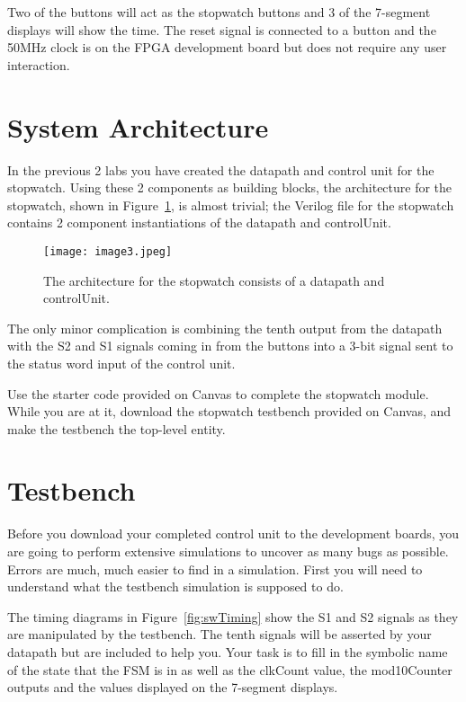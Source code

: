 Two of the buttons will act as the stopwatch buttons
and 3 of the 7-segment displays will show the time. The reset signal is
connected to a button and the 50MHz clock is on the FPGA
development board but does not require any user
interaction.

\section{System Architecture}

In the previous 2 labs you have created the datapath and control unit
for the stopwatch. Using these 2 components as building blocks, the
architecture for the stopwatch, shown in Figure~\ref{fig:swArch}, is almost trivial;
the Verilog file for the stopwatch contains 2 component instantiations
of the datapath and controlUnit.

\begin{figure}
\texttt{[image: image3.jpeg]}
\caption{The architecture for the stopwatch consists of a datapath and
controlUnit.}
\label{fig:swArch}
\end{figure}

The only minor complication is combining the tenth output from the
datapath with the S2 and S1 signals coming in from the
buttons into a 3-bit signal sent to the status word input of the control
unit.

Use the starter code provided on Canvas to complete the stopwatch
module. While you are at it, download the stopwatch testbench provided
on Canvas, and make the testbench the top-level entity.

\section{Testbench}

Before you download your completed control unit to the development boards,
you are going to perform extensive simulations to uncover as many bugs
as possible. Errors are much, much easier to find in a simulation. First
you will need to understand what the testbench simulation is supposed to
do.

The timing diagrams in Figure~\ref{fig:swTiming} show the S1 and S2 signals
as they are manipulated by the testbench. The tenth signals will be
asserted by your datapath but are included to help you. Your task is to
fill in the symbolic name of the state that the FSM is in as well as the
clkCount value, the mod10Counter outputs and the values displayed on the
7-segment displays.

